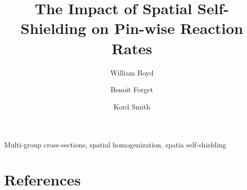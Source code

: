 \documentclass[authoryear,5p]{elsarticle}
\begin{document}
\begin{frontmatter}

\title{The Impact of Spatial Self-Shielding on Pin-wise Reaction Rates}

\author{William Boyd}

\author{Benoit Forget\corref{}}

\author{Kord Smith\corref{}}

\address{Massachusetts Institute of Technology, Department of Nuclear Science and Engineering, 77 Massachusetts Avenue, Building 24, Cambridge, MA 02139, United States\vspace{-8ex}}


\begin{abstract}

\end{abstract}

\begin{keyword}
Multi-group cross-sections, spatial homogenization, spatia self-shielding
\end{keyword}

\end{frontmatter}







\section*{References}


\end{document}
